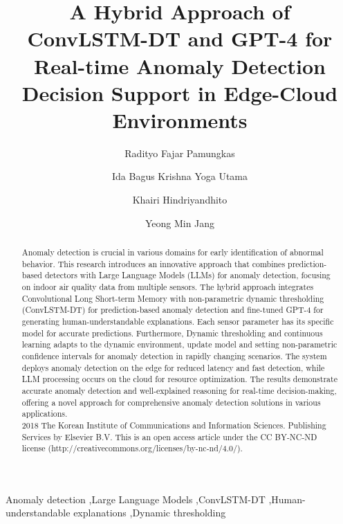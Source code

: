 \documentclass[final,3p,times,twocolumn]{elsarticle}
\begin{document}
\begin{frontmatter}

\title{A Hybrid Approach of ConvLSTM-DT and GPT-4 for Real-time Anomaly Detection Decision Support in Edge-Cloud Environments}
\author{Radityo Fajar Pamungkas}

\author{Ida Bagus Krishna Yoga Utama}

\author{Khairi Hindriyandhito}

\author{Yeong Min Jang}
\address{Department of Electronics Engineering, Kookmin University, Seoul, South Korea}


\begin{abstract}
Anomaly detection is crucial in various domains for early identification of abnormal behavior. This research introduces an innovative approach that combines prediction-based detectors with Large Language Models (LLMs) for anomaly detection, focusing on indoor air quality data from multiple sensors. The hybrid approach integrates Convolutional Long Short-term Memory with non-parametric dynamic thresholding (ConvLSTM-DT) for prediction-based anomaly detection and fine-tuned GPT-4 for generating human-understandable explanations. Each sensor parameter has its specific model for accurate predictions. Furthermore, Dynamic thresholding and continuous learning adapts to the dynamic environment, update model and setting non-parametric confidence intervals for anomaly detection in rapidly changing scenarios. The system deploys anomaly detection on the edge for reduced latency and fast detection, while LLM processing occurs on the cloud for resource optimization. The results demonstrate accurate anomaly detection and well-explained reasoning for real-time decision-making, offering a novel approach for comprehensive anomaly detection solutions in various applications. 
\\
2018 The Korean Institute of Communications and Information Sciences. Publishing Services by Elsevier B.V. This is an open access article under the CC BY-NC-ND license (http://creativecommons.org/licenses/by-nc-nd/4.0/).
\end{abstract}

\begin{keyword}
Anomaly detection \sep Large Language Models \sep ConvLSTM-DT \sep Human-understandable explanations \sep Dynamic thresholding
\end{keyword}

\end{frontmatter}
\end{document}
